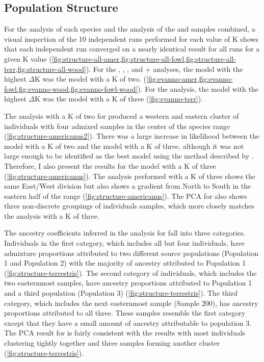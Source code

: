 \subsection{Population Structure}
For the \structure analysis of each species and the analysis of the \fowl and \wood
samples combined, a visual inspection of the 10 independent \structure runs 
performed for each value
of K shows that each independent run converged on a nearly identical result 
for all runs for a given K value 
(\cref{fig:structure-all-amer,fig:structure-all-fowl,fig:structure-all-terr,fig:structure-all-wood}).
For the \amer, \fowl, \wood, and \fowl + \wood analyses, the \structure model 
with the highest $\Delta$K was the model with a K of two.   
(\cref{fig:evanno-amer,fig:evanno-fowl,fig:evanno-wood,fig:evanno-fowl-wood}). 
For the \terr analysis, the \structure model with the highest $\Delta$K was 
the model with a K of three (\cref{fig:evanno-terr}).

The \structure analysis with a K of two for \amer produced a western and 
eastern cluster of individuals with four admixed samples in the center of 
the species range (\cref{fig:structure-americanus2}).
There was a large increase in likelihood between the model with a K of two and the
model with a K of three, although it was not large enough to be identified as 
the best model using the method described by \textcite{evanno2005}.
Therefore, I also present the \structure results for the model with a K of three
(\cref{fig:structure-americanus}).
The analysis performed with a K of three shows the same East/West division 
but also shows a gradient from North to South in the eastern half of the \amer 
range (\cref{fig:structure-americanus}).
The PCA for \amer also shows three non-discrete groupings of individuals \amer 
samples, which more closely matches the \structure analysis with a K of three.

The ancestry coefficients inferred in the \structure analysis for \terr fall 
into three categories. 
Individuals in the first category, which includes all but four individuals, 
have admixture proportions attributed to two different source populations (Population 1 and Population 2)  
with the majority of ancestry attributed to Population 1 (\cref{fig:structure-terrestris}).
The second category of individuals, which includes the two easternmost samples, have  
ancestry proportions attributed to Population 1 and a third population 
(Population 3) (\cref{fig:structure-terrestris}).
The third category, which includes the next easternmost sample (Sample 200), has 
ancestry proportions attributed to all three.
These samples resemble the first category except that they have a small amount
of ancestry attributable to population 3.
The PCA result for \terr is fairly consistent with the \structure results with 
most individuals clustering tightly together and three samples forming another 
cluster (\cref{fig:structure-terrestris}).



